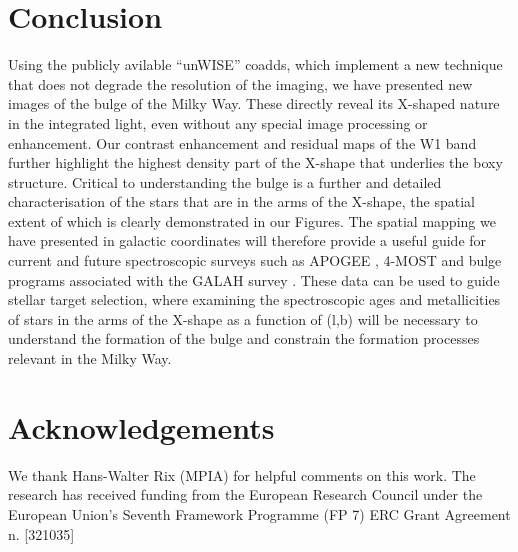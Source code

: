 \documentclass[12pt, preprint]{aastex}
\begin{document}
\section{Conclusion}

Using the publicly avilable ``unWISE'' coadds, which implement a new technique that does not degrade the resolution of the imaging, we have presented new images of the bulge of the Milky Way. These directly reveal its X-shaped nature in the integrated light, even without any special image processing or enhancement. Our contrast enhancement and residual maps of the W1 band further highlight the highest density part of the X-shape that underlies the boxy structure. Critical to understanding the bulge is a further and detailed characterisation of the stars that are in the arms of the X-shape, the spatial extent of which is clearly demonstrated in our Figures. The spatial mapping we have presented in galactic coordinates will therefore provide a useful guide for current and future spectroscopic surveys such as APOGEE \citep{Majewski2015}, 4-MOST \citep{4most} and bulge programs associated with the GALAH survey \citep{deSilva2015}. These data can be used to guide stellar target selection, where examining the spectroscopic ages \citep[e.g.][]{Martig2016, Ness2016} and metallicities of stars in the arms of the X-shape as a function of (l,b) will be necessary to understand the formation of the bulge and constrain the formation processes relevant in the Milky Way. 


\section{Acknowledgements} 
We thank Hans-Walter Rix (MPIA) for helpful comments on this work. 
The research has received funding from the European Research Council under the European Union's Seventh Framework Programme (FP 7) ERC Grant Agreement n.
[321035]


\end{document}
